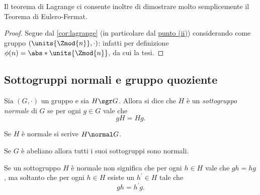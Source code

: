 Il teorema di Lagrange ci consente inoltre di dimostrare molto semplicemente il Teorema di Eulero-Fermat.
\begin{proof}
    Segue dal \autoref{cor:lagrange} (in particolare dal \hyperref[cor:x_alla_ordG=e_G]{punto (ii)}) considerando come gruppo $(\units{\Zmod{n}}, \cdot)$: infatti per definizione $\phi(n) = \abs*{\units{\Zmod{n}}}$, da cui la tesi.
\end{proof}

\subsection{Sottogruppi normali e gruppo quoziente}

\begin{definition}
     \label{def:sgr_normale}
    Sia $(G, \cdot)$ un gruppo e sia $H \sgr G$. Allora si dice che $H$ è un \emph{sottogruppo normale} di $G$ se per ogni $g \in G$ vale che \begin{equation} \label{eq:def_normale}
        gH = Hg.
    \end{equation} 
    
    Se $H$ è normale si scrive $H \normal G$.
\end{definition}

\begin{remark}
    Se $G$ è abeliano allora tutti i suoi sottogruppi sono normali.
\end{remark}
\begin{remark}
    Se un sottogruppo $H$ è normale non significa che per ogni $h \in H$ vale che $gh = hg$, ma soltanto che per ogni $h \in H$ esiste un $h^\prime \in H$ tale che \[
        gh = h^\prime g.    
    \]
\end{remark}

